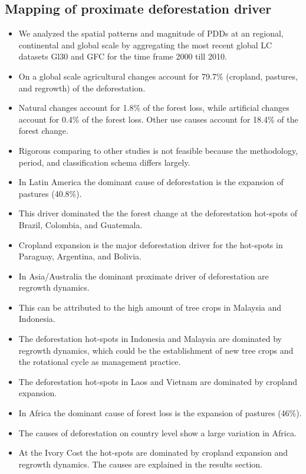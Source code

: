		\subsection{Mapping of proximate deforestation driver}
		\label{subsec:discussion_proxy_deforestation_driver}
			\begin{itemize}
				\item We analyzed the spatial patterns and magnitude of PDDs at an regional, continental and global scale by aggregating the most recent global \ac{LC} datasets \ac{Gl30} and \ac{GFC} for the time frame 2000 till 2010.
				\item On a global scale agricultural changes account for 79.7\% (cropland, pastures, and regrowth) of the deforestation.
				\item Natural changes account for 1.8\% of the forest loss, while artificial changes account for 0.4\% of the forest loss. Other use causes account for 18.4\% of the forest change.
				\item Rigorous comparing to other studies is not feasible because the methodology, period, and classification schema differs largely. 
				\item In Latin America the dominant cause of deforestation is the expansion of pastures (40.8\%). 
				\item This driver dominated the the forest change at the deforestation hot-spots of Brazil, Colombia, and Guatemala.
				\item Cropland expansion is the major deforestation driver for the hot-spots in Paraguay, Argentina, and Bolivia.
				\item In Asia/Australia the dominant proximate driver of deforestation are regrowth dynamics.
				\item This can be attributed to the high amount of tree crops in Malaysia and Indonesia.
				\item The deforestation hot-spots in Indonesia and Malaysia are dominated by regrowth dynamics, which could be the establishment of new tree crops and the rotational cycle as management practice.
				\item The deforestation hot-spots in Laos and Vietnam are dominated by cropland expansion.
				\item In Africa the dominant cause of forest loss is the expansion of pastures (46\%).
				\item The causes of deforestation on country level show a large variation in Africa.
				\item At the Ivory Cost the hot-spots are dominated by cropland expansion and regrowth dynamics. The causes are explained in the results section.

\end{itemize}
